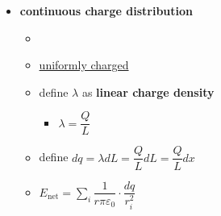 \documentclass{article}
\begin{document}
\begin{itemize}
\begin{tikzpicture}
      \end{tikzpicture}
    \item \textbf{continuous charge distribution}
      \begin{itemize}
        \item
        \item \underline{uniformly charged}
        \item define $\lambda$ as \textbf{linear charge density}
          \begin{itemize}
            \item $\lambda=\dfrac{Q}{L}$
          \end{itemize}
        \item define $dq=\lambda dL=\dfrac{Q}{L}dL=\dfrac{Q}{L}dx$
        \item $E_{\text{net}}=\sum_i \dfrac{1}{r\pi\varepsilon_0}\cdot\dfrac{dq}{r_i^2}$
      \end{itemize}
  \end{itemize}
\end{document}

